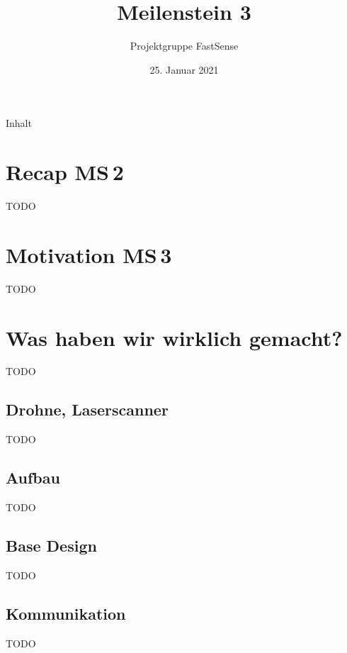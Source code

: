 \documentclass{beamer}
\title{Meilenstein 3}
\author{Projektgruppe FastSense}
\date{25. Januar 2021}
\begin{document}
{
\begin{frame}
\titlepage
\end{frame}}

\begin{frame}{Inhalt}
\tableofcontents
\end{frame}

\section{Recap MS\,2}
\begin{frame}{\secname}
TODO
\end{frame}

\section{Motivation MS\,3}
\begin{frame}{\secname}
TODO
\end{frame}

\section{Was haben wir wirklich gemacht?}
\begin{frame}{\secname}
TODO
\end{frame}

\subsection{Drohne, Laserscanner}
\begin{frame}{\subsecname}
TODO
\end{frame}

\subsection{Aufbau}
\begin{frame}{\subsecname}
TODO
\end{frame}

\subsection{Base Design}
\begin{frame}{\subsecname}
TODO
\end{frame}

\subsection{Kommunikation}
\begin{frame}{\subsecname}
TODO
\end{frame}
\end{document}
